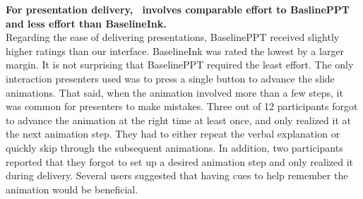 \textbf{For presentation delivery, \interface\ involves comparable effort to BaslinePPT and less effort than BaselineInk.}\\
%
%
Regarding the ease of delivering presentations, BaselinePPT received slightly higher ratings than our interface. BaselineInk was rated the lowest by a larger margin. 
%
%
It is not surprising that BaselinePPT required the least effort. The only interaction presenters used was to press a single button to advance the slide animations. That said, when the animation involved more than a few steps, it was common for presenters to make mistakes. Three out of 12 participants forgot to advance the animation at the right time at least once, and only realized it at the next animation step. They had to either repeat the verbal explanation or quickly skip through the subsequent animations. In addition, two participants reported that they forgot to set up a desired animation step and only realized it during delivery. Several users suggested that having cues to help remember the animation would be beneficial.

